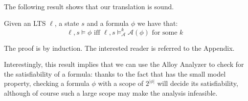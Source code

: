 The following result shows that our translation is sound.
\begin{theorem}\label{theorem:ctl-alloy} Given an LTS $\ell$, a state $s$ and a \ctl formula $\phi$ we have that:
$$
	\ell,s \vDash \phi \mbox{ iff } \ell, s \vDash^k_{\mathcal{A}} \mathcal{A}(\phi) \mbox{ for some $k$ }
$$
\end{theorem}
The proof is by induction. The interested reader is referred to the Appendix. 
 
Interestingly, this result implies that we can use the Alloy Analyzer to check for the satisfiability of a \ctl{} formula: thanks to the fact that \ctl{} has the small model property, checking a formula $\phi$ with a scope of $2^{|\phi|}$ will decide its satisfiability, although of course such a large scope may make the analysis infeasible. 
 

